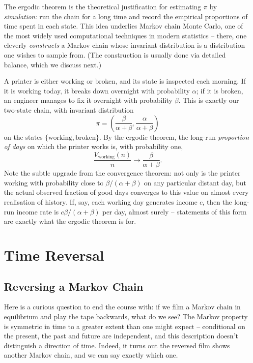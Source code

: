 \documentclass[a4paper]{scrartcl}
\begin{document}
\begin{remark}
	The ergodic theorem is the theoretical justification for estimating $\pi$ by \emph{simulation}: run the chain for a long time and record the empirical proportions of time spent in each state. This idea underlies Markov chain Monte Carlo, one of the most widely used computational techniques in modern statistics -- there, one cleverly \emph{constructs} a Markov chain whose invariant distribution is a distribution one wishes to sample from. (The construction is usually done via detailed balance, which we discuss next.)
\end{remark}

\begin{example}
	A printer is either working or broken, and its state is inspected each morning. If it is working today, it breaks down overnight with probability $\alpha$; if it is broken, an engineer manages to fix it overnight with probability $\beta$. This is exactly our two-state chain, with invariant distribution
	$$
	\pi = \left(\frac{\beta}{\alpha + \beta}, \frac{\alpha}{\alpha + \beta}\right)
	$$
	on the states $\{\text{working}, \text{broken}\}$. By the ergodic theorem, the long-run \emph{proportion of days} on which the printer works is, with probability one,
	$$
	\frac{V_{\text{working}}(n)}{n} \rightarrow \frac{\beta}{\alpha + \beta}.
	$$
	Note the subtle upgrade from the convergence theorem: not only is the printer working with probability close to $\beta/(\alpha + \beta)$ on any particular distant day, but the actual observed fraction of good days converges to this value on almost every realisation of history. If, say, each working day generates income $c$, then the long-run income rate is $c\beta/(\alpha + \beta)$ per day, almost surely -- statements of this form are exactly what the ergodic theorem is for.
\end{example}

\section{Time Reversal}

\subsection{Reversing a Markov Chain}

Here is a curious question to end the course with: if we film a Markov chain in equilibrium and play the tape backwards, what do we see? The Markov property is symmetric in time to a greater extent than one might expect -- conditional on the present, the past and future are independent, and this description doesn't distinguish a direction of time. Indeed, it turns out the reversed film shows another Markov chain, and we can say exactly which one.
\end{document}
